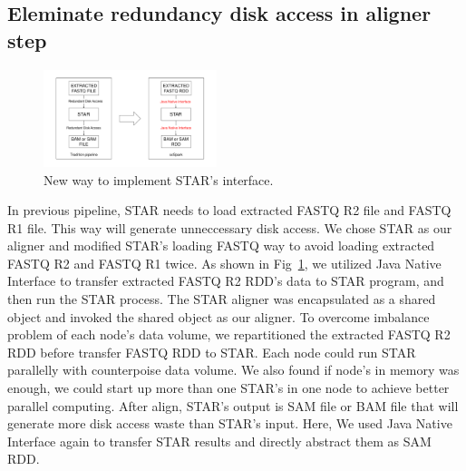 \documentclass[conference]{IEEEtran}
\begin{document}
\subsection{Eleminate redundancy disk access in aligner step}
\begin{figure}
	\includegraphics[width=0.45\textwidth]{Fig2.pdf}
	\caption{New way to implement STAR's interface.} \label{fig2}
\end{figure}
In previous pipeline, STAR needs to load extracted FASTQ R2 file and FASTQ R1 file.
This way will generate unneccessary disk access. 
We chose STAR as our aligner and modified STAR's loading FASTQ way to avoid loading extracted FASTQ R2 and FASTQ R1 twice. 
As shown in Fig~\ref{fig2}, we utilized Java Native Interface to transfer extracted FASTQ R2 RDD's data to STAR program, and then run the STAR process.
The STAR aligner was encapsulated as a shared object and invoked the shared object as our aligner. 
To overcome imbalance problem of each node's data volume, we repartitioned the extracted FASTQ R2 RDD before transfer FASTQ RDD to STAR.
Each node could run STAR parallelly with counterpoise data volume. 
We also found if node's in memory was enough, we could start up more than one STAR's in one node to achieve better parallel computing.
After align, STAR's output is SAM file or BAM file that will generate more disk access waste than STAR's input.
Here, We used Java Native Interface again to transfer STAR results and directly abstract them as SAM RDD. 
\end{document}
